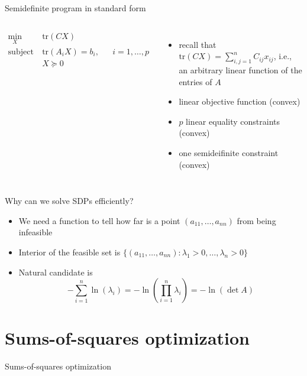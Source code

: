 \documentclass[aspectratio=169]{beamer}
\begin{document}
\begin{frame}{Semidefinite program in standard form}
\begin{columns}
\begin{align*}
\min_{X} \ & \text{tr}(C X) \\
\text{subject to} \ & \text{tr}(A_i X) = b_i, &&  i = 1, \ldots, p \\
& X \succeq 0
\end{align*}
\begin{itemize}
\item
recall that $\text{tr}(C X) = \sum_{i,j=1}^n C_{ij} x_{ij}$, i.e., an arbitrary linear function of the entries of $A$
\item
linear objective function (convex)
\item
$p$ linear equality constraints (convex)
\item
one semideifinite constraint (convex)
\end{itemize}
\end{columns}
\pause
\begin{block}{Why can we solve SDPs efficiently?}
\begin{itemize}
\item
We need a function to tell how far is a point $(a_{11},\dots, a_{nn})$ from being infeasible
\item
Interior of the feasible set is $\{ (a_{11},\dots, a_{nn}) : \lambda_1 > 0, \ldots, \lambda_n > 0 \}$
\item
Natural candidate is $$- \sum_{i=1}^n \ln (\lambda_i) = - \ln \left( \prod_{i=1}^n \lambda_i \right) = - \ln (\det A)$$
\end{itemize}
\end{block}
\end{frame}

\section{Sums-of-squares optimization}
\begin{frame}
\huge
\centering
{\color{darkred} Sums-of-squares optimization}
\end{frame}
\end{document}
